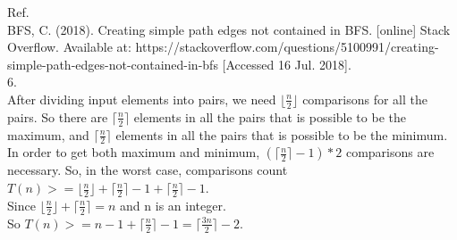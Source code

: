 \documentclass{article}
\begin{document}
Ref.\\
BFS, C. (2018). Creating simple path edges not contained in BFS. [online] Stack Overflow. Available at: https://stackoverflow.com/questions/5100991/creating-simple-path-edges-not-contained-in-bfs [Accessed 16 Jul. 2018].\\

6.\\
After dividing input elements into pairs, we need $\lfloor \frac{n}{2} \rfloor$ comparisons for all the pairs. 
So there are $\lceil \frac{n}{2} \rceil$ elements in all the pairs that is possible to be the maximum, 
and $\lceil \frac{n}{2} \rceil$ elements in all the pairs that is possible to be the minimum.\\
In order to get both maximum and minimum, $(\lceil \frac{n}{2} \rceil -1) * 2$ comparisons are necessary.
So, in the worst case, comparisons count $T(n) >= \lfloor \frac{n}{2} \rfloor + \lceil \frac{n}{2} \rceil - 1 + \lceil \frac{n}{2} \rceil - 1$.\\
Since $\lfloor \frac{n}{2} \rfloor + \lceil \frac{n}{2} \rceil = n$ and n is an integer.\\
So $T(n) >= n - 1 + \lceil \frac{n}{2} \rceil - 1 = \lceil \frac{3n}{2} \rceil - 2$.\\
\end{document}
